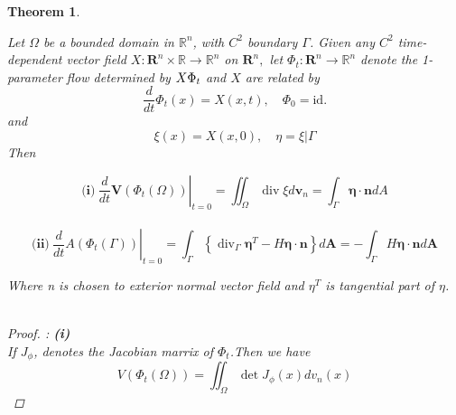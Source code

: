 \documentclass[oneside]{book}
\newtheorem{theorem}{Theorem}[section]
\begin{document}
\begin{theorem}
\label{t:3}














 Let $\Omega$ be a bounded domain in $\mathbb{R}^{n}$, with $C^{2}$ boundary $\Gamma$. Given
any $C^{2}$ time-dependent vector field $X: \mathbf{R}^{n} \times \mathbb{R} \rightarrow \mathbb{R}^{n}$ on $\mathbf{R}^{n},$ let $\Phi_{t}: \mathbf{R}^{n} \rightarrow \mathbb{R}^{n}$
denote the 1-parameter flow determined by $X\\ \Phi_{t}$ and $X$ are related by $$\frac{d}{d t} \Phi_{t}(x)=X(x, t), \quad \Phi_{0}=\mathrm{id.}$$
 and $$\xi(x)=X(x, 0), \quad \eta=\xi | \Gamma$$
 Then 
 
 
 \begin{equation}
  \label{eq23}
      {\textbf{(i)}}\ \left.\frac{d}{d t} \mathbf{V}\left(\Phi_{t}(\Omega)\right)\right|_{t=0}=\iint_{\Omega} \operatorname{div} \xi d \mathbf{v}_{n}=\int_{\Gamma} \boldsymbol{\eta} \cdot \mathbf{n} d A
  \end{equation}    
    \\
    
    
    
    
    
    
    
 \begin{equation}
  \label{eq24}
 {\textbf{(ii)}}\  \left.\frac{d}{d t} A\left(\Phi_{t}(\Gamma)\right)\right|_{t=0}=\int_{\Gamma}\left\{\operatorname{div}_{\Gamma} \boldsymbol{\eta}^{T}-H \boldsymbol{\eta} \cdot \mathbf{n}\right\} d \boldsymbol{A}=-\int_{\Gamma} H \boldsymbol{\eta} \cdot \mathbf{n} d \boldsymbol{A}
 \end{equation}
 


 Where n is chosen to exterior normal vector field and ${\eta}^{T}$ is tangential part of  $\eta$.\\\\
 

\begin{proof}: \textbf{(i)}  \\
If $J_{\phi}$, denotes the Jacobian marrix of $\Phi_{t}$.Then we have \\

 
\begin{equation}
 \label{eq25}
    V\left(\Phi_{t}(\Omega)\right)=\iint_{\Omega} \operatorname{det} J_{\phi}(x) d v_{n}(x)
     \end{equation} 
    

\end{proof}
\end{theorem}
\end{document}

